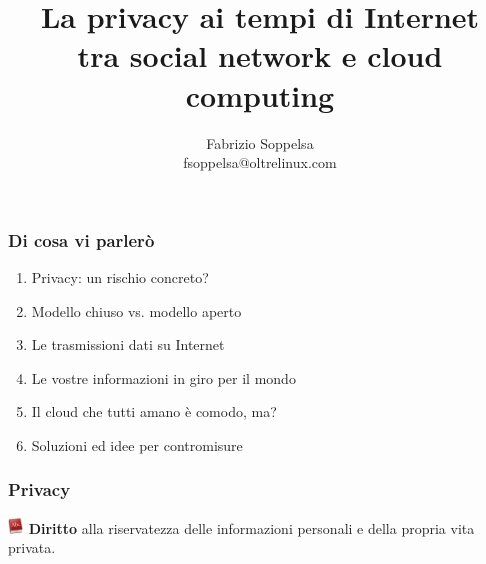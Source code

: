 \documentclass[xcolor=svgnames]{beamer}
\title[Noi ai tempi dei social network e del cloud computing]{La privacy ai tempi di Internet \\ tra social network e cloud computing}
\author{Fabrizio Soppelsa \\ fsoppelsa@oltrelinux.com}
\date{}
\begin{document}
\frame[plain]{\titlepage}
\begin{frame}
	\frametitle{Di cosa vi parlerò}

	\begin{enumerate}
				\pause
		\item Privacy: un rischio concreto?
				\pause
		\item Modello chiuso vs. modello aperto
				\pause
		\item Le trasmissioni dati su Internet
				\pause
		\item Le vostre informazioni in giro per il mondo
				\pause
		\item Il cloud che tutti amano è comodo, ma?
				\pause
		\item Soluzioni ed idee per contromisure
	\end{enumerate}
\end{frame}
\begin{frame}
	\frametitle{Privacy}

	\begin{block}{\includegraphics[width=16px]{img/dictionary.png}}
		{\bf Diritto} alla riservatezza delle informazioni personali e della propria vita privata.
	\end{block}

		\pause

		
		\pause


\end{frame}
\end{document}
